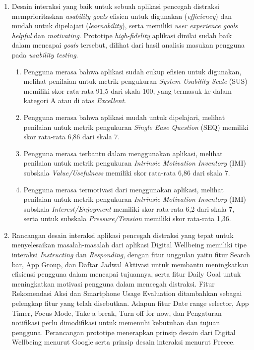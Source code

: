 \begin{enumerate}
  \item Desain interaksi yang baik untuk sebuah aplikasi pencegah distraksi memprioritaskan \textit{usability goals} efisien untuk digunakan (\textit{efficiency}) dan mudah untuk dipelajari (\textit{learnability}), serta memiliki \textit{user experience goals} \textit{helpful} dan \textit{motivating}. Prototipe \textit{high-fidelity} aplikasi dinilai sudah baik dalam mencapai \textit{goals} tersebut, dilihat dari hasil analisis masukan pengguna pada \textit{usability testing}.
    \begin{enumerate}[label=\alph*.]
      \item Pengguna merasa bahwa aplikasi sudah cukup efisien untuk digunakan, melihat penilaian untuk metrik pengukuran \textit{System Usability Scale} (SUS) memiliki skor rata-rata 91,5 dari skala 100, yang termasuk ke dalam kategori A atau di atas \textit{Excellent}. 
      
      \item Pengguna merasa bahwa aplikasi mudah untuk dipelajari, melihat penilaian untuk metrik pengukuran \textit{Single Ease Question} (SEQ) memiliki skor rata-rata 6,86 dari skala 7.
      
      \item Pengguna merasa terbantu dalam menggunakan aplikasi, melihat penilaian untuk metrik pengukuran \textit{Intrinsic Motivation Inventory} (IMI) subskala \textit{Value/Usefulness} memiliki skor rata-rata 6,86 dari skala 7.
      
      \item Pengguna merasa termotivasi dari menggunakan aplikasi, melihat penilaian untuk metrik pengukuran \textit{Intrinsic Motivation Inventory} (IMI) subskala \textit{Interest/Enjoyment} memiliki skor rata-rata 6,2 dari skala 7, serta untuk subskala \textit{Pressure/Tension} memiliki skor rata-rata 1,36.
        
    \end{enumerate}
    
  \item Rancangan desain interaksi aplikasi pencegah distraksi yang tepat untuk menyelesaikan masalah-masalah dari aplikasi Digital Wellbeing memiliki tipe interaksi \textit{Instructing} dan \textit{Responding}, dengan fitur unggulan yaitu fitur Search bar, App Group, dan Daftar Jadwal Aktivasi untuk membantu meningkatkan efisiensi pengguna dalam mencapai tujuannya, serta fitur Daily Goal untuk meningkatkan motivasi pengguna dalam mencegah distraksi. Fitur Rekomendasi Aksi dan Smartphone Usage Evaluation ditambahkan sebagai pelengkap fitur yang telah disebutkan. Adapun fitur Date range selector, App Timer, Focus Mode, Take a break, Turn off for now, dan Pengaturan notifikasi perlu dimodifikasi untuk memenuhi kebutuhan dan tujuan pengguna. Perancangan prototipe menerapkan prinsip desain dari Digital Wellbeing menurut Google serta prinsip desain interaksi menurut Preece.  
   
\end{enumerate}

